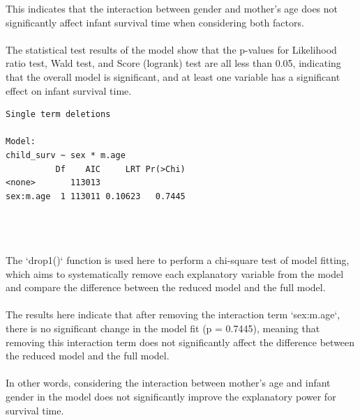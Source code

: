 \documentclass[12pt,letterpaper]{article}
\begin{document}
This indicates that the interaction between gender and mother's age does not significantly affect infant survival time when considering both factors.\\\\
The statistical test results of the model show that the p-values for Likelihood ratio test, Wald test, and Score (logrank) test are all less than 0.05, indicating that the overall model is significant, and at least one variable has a significant effect on infant survival time.\\

\begin{verbatim}
Single term deletions

Model:
child_surv ~ sex * m.age
          Df    AIC     LRT Pr(>Chi)
<none>       113013                 
sex:m.age  1 113011 0.10623   0.7445
\end{verbatim}
\\\\\\
The `drop1()` function is used here to perform a chi-square test of model fitting, which aims to systematically remove each explanatory variable from the model and compare the difference between the reduced model and the full model.\\\\
The results here indicate that after removing the interaction term `sex:m.age`, there is no significant change in the model fit (p = 0.7445), meaning that removing this interaction term does not significantly affect the difference between the reduced model and the full model.\\\\
In other words, considering the interaction between mother's age and infant gender in the model does not significantly improve the explanatory power for survival time.\\
\end{document}
